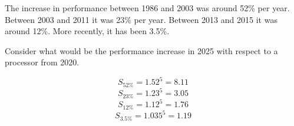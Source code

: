 \begin{acexercise}\end{acexercise}

The increase in performance between 1986 and 2003 was around 52\% per year.
Between 2003 and 2011 it was 23\% per year. Between 2013 and 2015 it was
around 12\%. More recently, it has been 3.5\%.

Consider what would be the performance increase in 2025 with respect to
a processor from 2020.

\begin{acsolution}\end{acsolution}

\[S_{52\%} = 1.52^5 = 8.11\]
\[S_{23\%} = 1.23^5 = 3.05\]
\[S_{12\%} = 1.12^5 = 1.76\]
\[S_{3.5\%} = 1.035^5 = 1.19\]

